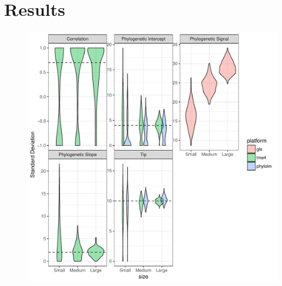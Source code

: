 % 
% 

\section{Results}

\begin{center}
\begin{figure}[h]
  \includegraphics[scale=0.8,page=1]{./git_push/ssplot.pdf}
  \caption{}
\label{ssplot}
\end{figure}
\end{center}

